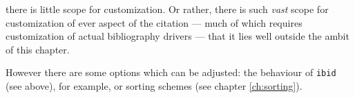  there is little scope for
customization. Or rather, there is such \emph{vast} scope for
customization of ever aspect of the citation --- much of which
requires customization of actual bibliography drivers --- that it lies
well outside the ambit of this chapter.

However there are some options which can be adjusted: the behaviour of
\verb|ibid| (see above), for
example, or sorting schemes (see chapter \ref{ch:sorting}).


